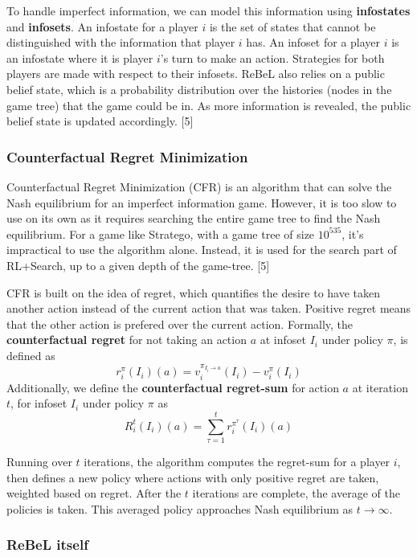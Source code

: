 \documentclass{article}
\begin{document}
To handle imperfect information, we can model this information using \textbf{infostates} and \textbf{infosets}. 
An infostate for a player $i$ is the set of states that cannot be distinguished with the information that player $i$ has. 
An infoset for a player $i$ is an infostate where it is player $i$’s turn to make an action. Strategies for both players are made with respect to their infosets. 
ReBeL also relies on a public belief state, which is a probability distribution over the histories (nodes in the game tree) that the game could be in. 
As more information is revealed, the public belief state is updated accordingly. [5]

\subsubsection{Counterfactual Regret Minimization}

Counterfactual Regret Minimization (CFR) is an algorithm that can solve the Nash equilibrium for an imperfect information game. 
However, it is too slow to use on its own as it requires searching the entire game tree to find the Nash equilibrium. 
For a game like Stratego, with a game tree of size $10^{535}$, it’s impractical to use the algorithm alone. Instead, it is used for the search part of RL+Search, up to a given depth of the game-tree. [5]

CFR is built on the idea of regret, which quantifies the desire to have taken another action instead of the current action that was taken. Positive regret means that the other action is prefered over the current action. 
Formally, the \textbf{counterfactual regret} for not taking an action $a$ at infoset $I_i$ under policy $\pi$, is defined as $$ r^{\pi}_i(I_i)(a) = v_i^{\pi_{I_i \rightarrow a}}(I_i) - v_i^{\pi}(I_i) $$ 
Additionally, we define the \textbf{counterfactual regret-sum} for action $a$ at iteration $t$, for infoset $I_i$ under policy $\pi$ as $$ R_i^t(I_i)(a) = \sum_{\tau = 1}^t r_i^{\pi^\tau}(I_i)(a) $$ 

Running over $t$ iterations, the algorithm computes the regret-sum for a player $i$, then defines a new policy where actions with only positive regret are taken, weighted based on regret. 
After the $t$ iterations are complete, the average of the policies is taken. This averaged policy approaches Nash equilibrium as $t \rightarrow \infty$. 

\subsubsection{ReBeL itself}
\end{document}
